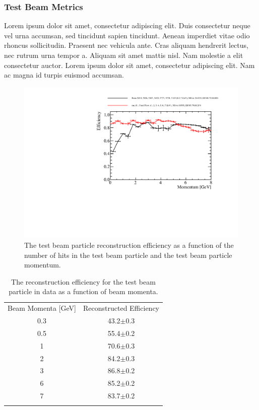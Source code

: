 \subsubsection{Test Beam Metrics}

Lorem ipsum dolor sit amet, consectetur adipiscing elit. Duis consectetur neque vel urna accumsan, sed tincidunt sapien tincidunt. Aenean imperdiet vitae odio rhoncus sollicitudin. Praesent nec vehicula ante. Cras aliquam hendrerit lectus, nec rutrum urna tempor a. Aliquam sit amet mattis nisl. Nam molestie a elit consectetur auctor. Lorem ipsum dolor sit amet, consectetur adipiscing elit. Nam ac magna id turpis euismod accumsan.

\begin{figure}
\includegraphics[width=1.0\textwidth]{Figures/Metrics/Data/Beam/BeamParticleEfficiencyVsMomentum.pdf}
\caption{The test beam particle reconstruction efficiency as a function of the number of hits in the test beam particle and the test beam particle momentum.}
\label{fig:7}
\end{figure}

\begin{table}
\caption{The reconstruction efficiency for the test beam particle in data as a function of beam momenta.}
\label{tab:1} 
\begin{tabular}{cc}
\hline\noalign{\smallskip}
Beam Momenta [GeV] & Reconstructed Efficiency  \\
\noalign{\smallskip}\hline\noalign{\smallskip}
0.3 & 43.2$\pm$0.3 \\
0.5 & 55.4$\pm$0.2 \\
1 & 70.6$\pm$0.3 \\
2 & 84.2$\pm$0.3 \\
3 & 86.8$\pm$0.2 \\
6 & 85.2$\pm$0.2 \\
7 & 83.7$\pm$0.2 \\
\noalign{\smallskip}\hline
\end{tabular}
\end{table}

